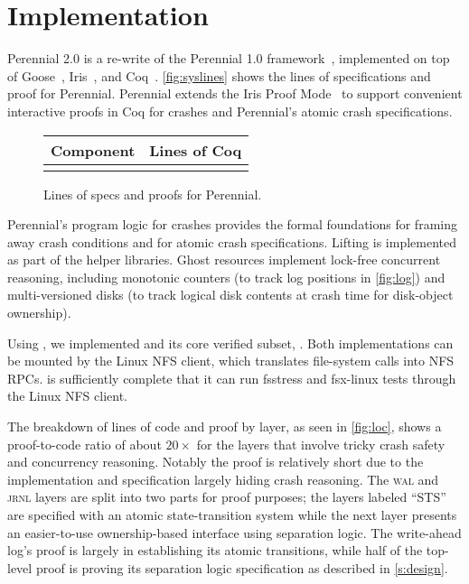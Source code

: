 \section{Implementation}
\label{s:impl}

Perennial 2.0 is a re-write of the Perennial 1.0 framework~\cite{chajed:perennial}, implemented on top of
Goose~\cite{chajed:perennial, chajed:goose-coqpl},
Iris~\cite{jung:iris-jfp,jung:iris-1}, and Coq~\cite{coq}.  \autoref{fig:syslines}
shows the lines of specifications and proof for Perennial.  Perennial extends
the Iris Proof Mode~\cite{krebbers:ipm} to support convenient interactive
proofs in Coq for crashes and Perennial's atomic crash specifications.

\begin{figure}
\centering
\small
\begin{tabular}{lr}
\toprule
\bf Component & \bf Lines of Coq \\
\midrule
   \\
\bottomrule

\end{tabular}
\caption{Lines of specs and proofs for Perennial.}
\label{fig:syslines}
\end{figure}

Perennial's program logic for crashes provides the formal foundations for
framing away crash conditions and for atomic crash specifications.
Lifting is implemented as part of the helper libraries.  Ghost resources
implement lock-free concurrent reasoning, including
monotonic counters (to track log positions in \autoref{fig:log}) and
multi-versioned disks (to track logical disk contents at crash time
for disk-object ownership).

Using \txn, we implemented \gnfs and its core verified subset,
\simplenfs.  Both implementations can be mounted by the
Linux NFS client, which translates file-system calls into NFS RPCs.
\gnfs is sufficiently complete that it can run fsstress and fsx-linux
tests through the Linux NFS client.

The breakdown of lines of code and proof by layer, as seen in \autoref{fig:loc},
shows a proof-to-code ratio of about $20\times$ for the layers that involve
tricky crash safety and concurrency reasoning. Notably the \simplenfs proof is
relatively short due to the \txn implementation and specification largely hiding
crash reasoning. The \textsc{wal} and \textsc{jrnl} layers are split into two
parts for proof purposes; the layers labeled ``STS'' are specified with an
atomic state-transition system while the next layer presents an easier-to-use
ownership-based interface using separation logic. The write-ahead log's proof is
largely in establishing its atomic transitions, while half of the top-level \txn
proof is proving its separation logic specification as described in
\autoref{s:design}.

